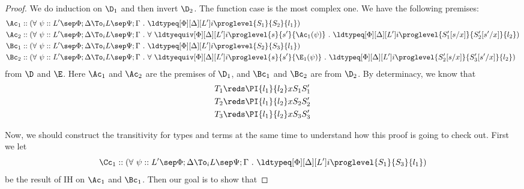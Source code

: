 \begin{proof}
  We do induction on $\D_1$ and then invert $\D_2$. %
  The function case is the most complex one. %
  We have the following premises:
  \begin{align*}
    \Ac_1 &:: (\forall~ \psi :: L' \sep \Phi;\Delta \To_i L \sep \Psi; \Gamma ~.~
    \ldtypeq[\Phi][\Delta][L'] i \proglevel{S_1}{S_2}{l_1}) \\
    \Ac_2 &:: (\forall~ \psi :: L' \sep \Phi;\Delta \To_i L \sep \Psi; \Gamma ~.~ \forall~ \ldtyequiv[\Phi][\Delta][L']
    i \proglevel {s}{s'}{\Ac_1(\psi)} ~.~
    \ldtypeq[\Phi][\Delta][L'] i \proglevel{S_1'[s/x]}{S_2'[s'/x]}{l_2}) \\
    \Bc_1 &:: (\forall~ \psi :: L' \sep \Phi;\Delta \To_i L \sep \Psi; \Gamma ~.~
    \ldtypeq[\Phi][\Delta][L'] i \proglevel{S_2}{S_3}{l_1}) \\
    \Bc_2 &:: (\forall~ \psi :: L' \sep \Phi;\Delta \To_i L \sep \Psi; \Gamma ~.~ \forall~ \ldtyequiv[\Phi][\Delta][L']
    i \proglevel {s}{s'}{\E_1(\psi)} ~.~
    \ldtypeq[\Phi][\Delta][L'] i \proglevel{S_2'[s/x]}{S_3'[s'/x]}{l_2})
  \end{align*}
  from $\D$ and $\E$. %
  Here $\Ac_1$ and $\Ac_2$ are the premises of $\D_1$, and $\Bc_1$ and $\Bc_2$ are from $\D_2$. %
  By determinacy, we know that
  \begin{gather*}
    T_1 \reds \PI{l_1}{l_2} x{S_1}{S_1'} \\
    T_2 \reds \PI{l_1}{l_2} x{S_2}{S_2'} \\
    T_3 \reds \PI{l_1}{l_2} x{S_3}{S_3'}
  \end{gather*}

  Now, we should construct the transitivity for types and terms at the same time to
  understand how this proof is going to check out. %
  First we let 
  \[
    \Cc_1 :: (\forall~ \psi :: L' \sep \Phi;\Delta \To_i L \sep \Psi; \Gamma ~.~
    \ldtypeq[\Phi][\Delta][L'] i \proglevel{S_1}{S_3}{l_1})
  \]
  be the result of IH on $\Ac_1$ and $\Bc_1$. %
  Then our goal is to show that 
  

\end{proof}

